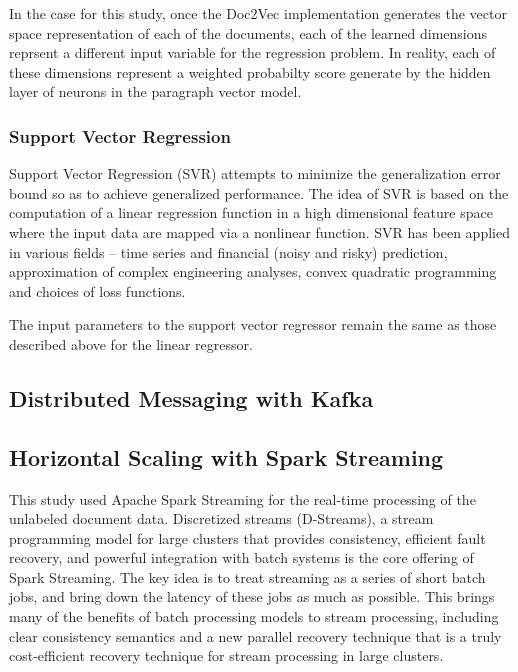 \documentclass[conference]{IEEEtran}
\begin{document}
In the case for this study, once the Doc2Vec implementation generates the vector space representation of each of the documents, each of the learned dimensions reprsent a different input variable for the regression problem. In reality, each of these dimensions represent a weighted probabilty score generate by the hidden layer of neurons in the paragraph vector model.

\subsubsection{Support Vector Regression}
Support Vector Regression (SVR) attempts to minimize the generalization error bound so as to achieve generalized performance. The idea of SVR is based on the computation of a linear regression function in a high dimensional feature space where the input data are mapped via a nonlinear function. SVR has been applied in various fields – time series and financial (noisy and risky) prediction, approximation of complex engineering analyses, convex quadratic programming and choices of loss functions\cite{basak2007support}.

The input parameters to the support vector regressor remain the same as those described above for the linear regressor.


\subsection{Distributed Messaging with Kafka}


\subsection{Horizontal Scaling with Spark Streaming}
This study used Apache Spark Streaming for the real-time processing of the unlabeled document data. Discretized streams (D-Streams), a stream programming model for large clusters that provides consistency, efficient fault recovery, and powerful integration with batch systems is the core offering of Spark Streaming. The key idea is to treat streaming as a series of short batch jobs, and bring down the latency of these jobs as much as possible. This brings many of the benefits of batch processing models to stream processing, including clear consistency semantics and a new parallel recovery technique that is a truly cost-efficient recovery technique for stream processing in large clusters\cite{zaharia2012discretized}.

\vspace{5mm}
\end{document}
